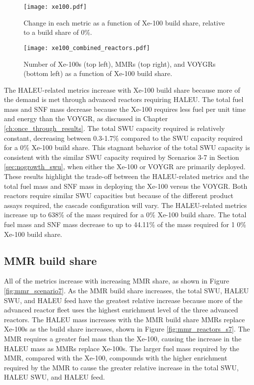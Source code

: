 \begin{figure}[h!]
    \centering
    \texttt{[image: xe100.pdf]}
    \caption{Change in each metric as a function of Xe-100 build share, 
    relative to a build share of 0\%.}
    \label{fig:xe100_scenario7}
\end{figure}

\begin{figure}[h!]
    \centering
    \texttt{[image: xe100\_combined\_reactors.pdf]}
    \caption{Number of Xe-100s (top left), MMRs (top right), and VOYGRs
    (bottom left) as a function of Xe-100 build share.}
    \label{fig:xe100_s7_combined_reactors}
\end{figure}

The \gls{HALEU}-related metrics increase with Xe-100 build share because more of 
the demand is met through advanced reactors requiring \gls{HALEU}. The total 
fuel mass and \gls{SNF} mass decrease because the 
Xe-100 requires less fuel per unit time and energy than the VOYGR, as discussed 
in Chapter \ref{ch:once_through_results}. The total \gls{SWU} capacity required 
is relatively constant, decreasing between 0.3-1.7\% compared to the \gls{SWU} capacity 
required for a 0\% Xe-100 build share. This stagnant behavior of the total 
\gls{SWU} capacity is consistent with the similar \gls{SWU} capacity required 
by Scenarios 3-7 in Section \ref{sec:nogrowth_swu}, when either the Xe-100 or 
VOYGR are primarily deployed. These results highlight the trade-off between the
\gls{HALEU}-related metrics and the total fuel mass and \gls{SNF} mass in deploying 
the Xe-100 versus the VOYGR. Both reactors require similar \gls{SWU} capacities 
but because of the different product assays required, the cascade configuration 
will vary. The \gls{HALEU}-related metrics increase up to 638\% of the 
mass required 
for a 0\% Xe-100 build share. The total fuel mass and \gls{SNF} mass decrease 
to up to 44.11\% of the mass required for 1 0\% Xe-100 build share. 

\subsection{MMR build share}
All of the metrics increase with increasing \gls{MMR} share, as shown 
in Figure \ref{fig:mmr_scenario7}. As the \gls{MMR} build share 
increases, the total \gls{SWU}, \gls{HALEU} \gls{SWU}, 
and \gls{HALEU} feed have the greatest relative increase because more of the 
advanced reactor fleet uses the highest enrichment level of the three 
advanced reactors. The \gls{HALEU} mass 
increases with the \gls{MMR} build share \glspl{MMR} replace Xe-100s
as the build share increases, shown in  
Figure \ref{fig:mmr_reactors_s7}.
The \gls{MMR} requires a greater fuel mass than the Xe-100, causing the increase 
in the \gls{HALEU} mass as \glspl{MMR} replace Xe-100s. 
The larger fuel mass required by the \gls{MMR}, compared 
with the Xe-100, compounds with the higher enrichment required by the \gls{MMR} 
to cause the greater relative increase in the total \gls{SWU}, \gls{HALEU} \gls{SWU}, 
and \gls{HALEU} feed. 

